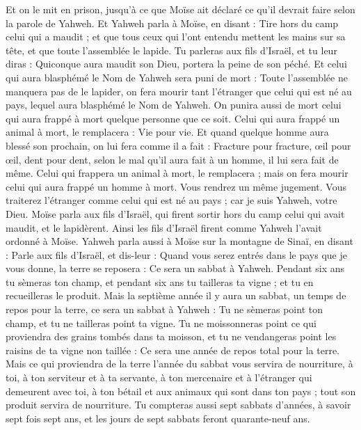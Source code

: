 \begin{multicols}{2}
Et on le mit en prison, jusqu'à ce que Moïse ait déclaré ce qu'il devrait faire selon la parole de Yahweh.
Et Yahweh parla à Moïse, en disant :
Tire hors du camp celui qui a maudit ; et que tous ceux qui l'ont entendu mettent les mains sur sa tête, et que toute l'assemblée le lapide.
Tu parleras aux fils d'Israël, et tu leur diras : Quiconque aura maudit son Dieu, portera la peine de son péché.
Et celui qui aura blasphémé le Nom de Yahweh sera puni de mort : Toute l'assemblée ne manquera pas de le lapider, on fera mourir tant l'étranger que celui qui est né au pays, lequel aura blasphémé le Nom de Yahweh.
On punira aussi de mort celui qui aura frappé à mort quelque personne que ce soit.
Celui qui aura frappé un animal à mort, le remplacera : Vie pour vie.
Et quand quelque homme aura blessé son prochain, on lui fera comme il a fait :
Fracture pour fracture, œil pour œil, dent pour dent, selon le mal qu'il aura fait à un homme, il lui sera fait de même.
Celui qui frappera un animal à mort, le remplacera ; mais on fera mourir celui qui aura frappé un homme à mort.
Vous rendrez un même jugement. Vous traiterez l'étranger comme celui qui est né au pays ; car je suis Yahweh, votre Dieu.
Moïse parla aux fils d'Israël, qui firent sortir hors du camp celui qui avait maudit, et le lapidèrent. Ainsi les fils d'Israël firent comme Yahweh l'avait ordonné à Moïse.
\VerseOne{}Yahweh parla aussi à Moïse sur la montagne de Sinaï, en disant :
Parle aux fils d'Israël, et dis-leur : Quand vous serez entrés dans le pays que je vous donne, la terre se reposera : Ce sera un sabbat à Yahweh.
Pendant six ans tu sèmeras ton champ, et pendant six ans tu tailleras ta vigne ; et tu en recueilleras le produit.
Mais la septième année il y aura un sabbat, un temps de repos pour la terre, ce sera un sabbat à Yahweh : Tu ne sèmeras point ton champ, et tu ne tailleras point ta vigne.
Tu ne moissonneras point ce qui proviendra des grains tombés dans ta moisson, et tu ne vendangeras point les raisins de ta vigne non taillée : Ce sera une année de repos total pour la terre.
Mais ce qui proviendra de la terre l'année du sabbat vous servira de nourriture, à toi, à ton serviteur et à ta servante, à ton mercenaire et à l'étranger qui demeurent avec toi,
à ton bétail et aux animaux qui sont dans ton pays ; tout son produit servira de nourriture.
Tu compteras aussi sept sabbats d'années, à savoir sept fois sept ans, et les jours de sept sabbats feront quarante-neuf ans.

\end{multicols}
